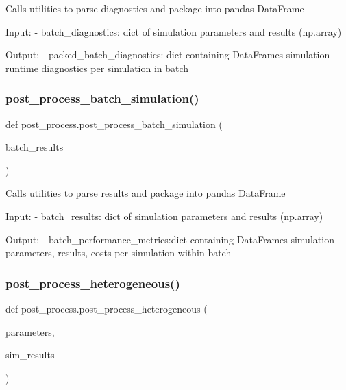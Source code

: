 \begin{DoxyVerb}Calls utilities to parse diagnostics and package into pandas DataFrame

Input:
- batch_diagnostics:            dict of simulation parameters and results (np.array)

Output:
- packed_batch_diagnostics:     dict containing DataFrames simulation runtime diagnostics per simulation in batch\end{DoxyVerb}
 \mbox{\label{namespacepost__process_a2009d5938a8919bd33d7d274148e5263}} 
\subsubsection{\texorpdfstring{post\_process\_batch\_simulation()}{post\_process\_batch\_simulation()}}
{\footnotesize\ttfamily def post\+\_\+process.\+post\+\_\+process\+\_\+batch\+\_\+simulation (\begin{DoxyParamCaption}\item[{}]{batch\+\_\+results }\end{DoxyParamCaption})}

\begin{DoxyVerb}Calls utilities to parse results and package into pandas DataFrame

Input:
- batch_results:            dict of simulation parameters and results (np.array)

Output:
- batch_performance_metrics:dict containing DataFrames simulation parameters, results, costs per simulation within
batch\end{DoxyVerb}
 \mbox{\label{namespacepost__process_a03fb7a7f49933480f1162e53995ca131}} 
\subsubsection{\texorpdfstring{post\_process\_heterogeneous()}{post\_process\_heterogeneous()}}
{\footnotesize\ttfamily def post\+\_\+process.\+post\+\_\+process\+\_\+heterogeneous (\begin{DoxyParamCaption}\item[{}]{parameters,  }\item[{}]{sim\+\_\+results }\end{DoxyParamCaption})}

